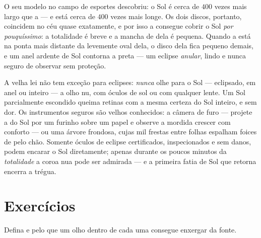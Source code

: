\begin{example}\label{ex:g7:shadows-eclipses:coincidence}
O seu modelo no campo de esportes descobriu: o Sol é cerca de $400$
vezes mais largo que a  --- e está cerca de $400$ vezes mais
longe. Os dois discos, portanto, coincidem no céu quase exatamente, e
por isso a  consegue cobrir o Sol \emph{por pouquíssimo}: a
totalidade é breve e a mancha de  dela é pequena. Quando a 
está na ponta mais distante da  levemente oval dela, o disco
dela fica pequeno demais, e um anel ardente de Sol contorna a 
preta --- um eclipse \emph{anular}, lindo e nunca seguro de observar
sem proteção.
\end{example}

\begin{remark}\label{rem:g7:shadows-eclipses:safety}
A velha lei não tem exceção para eclipses: \emph{nunca} olhe para o
Sol --- eclipsado, em anel ou inteiro --- a olho nu, com óculos de
sol ou com qualquer lente. Um Sol parcialmente escondido queima
retinas com a mesma certeza do Sol inteiro, e sem dor. Os
instrumentos seguros são velhos conhecidos: a câmera de furo ---
projete a  do Sol por um furinho sobre um papel e observe a
mordida crescer com conforto --- ou uma árvore frondosa, cujas mil
frestas entre folhas espalham foices de  pelo chão. Somente óculos
de eclipse certificados, inspecionados e sem danos, podem encarar o
Sol diretamente; apenas durante os poucos minutos da \emph{totalidade}
a coroa nua pode ser admirada --- e a primeira fatia de Sol que
retorna encerra a trégua.
\end{remark}

\section{Exercícios}

\begin{exercise}[$\star$]\label{exo:g7:shadows-eclipses:1}
Defina  e  pelo que um olho dentro de cada uma consegue
enxergar da fonte.
\end{exercise}

